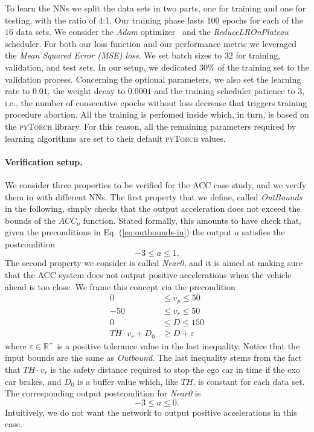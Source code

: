 To learn the NNs we split the data sets in two parts,
one for training and one for testing, with the ratio of 4:1. Our
training phase lasts $100$ epochs for each of the $16$ data sets. We
consider the \textit{Adam} optimizer~\cite{kingma2017adam} and the
\textit{ReduceLROnPlateau} scheduler. For both our loss
function and our performance metric we leveraged the \textit{Mean
	Squared Error (MSE) loss}. We set batch sizes to $32$ for training,
validation, and test sets. In our setup, we dedicated $30\%$ of the
training set to the validation process. Concerning the optional
parameters, we also set the learning rate to $0.01$, the weight decay
to $0.0001$ and the training scheduler patience to $3$, i.e., the
number of consecutive epochs without loss decrease that triggers
training procedure abortion. All the training is perfomed inside
\nevertwo{} which, in turn, is based on the \textsc{pyTorch}
library. For this reason, all the remaining parameters required by 
learning algorithms are set to their default \textsc{pyTorch} values.

\paragraph{Verification setup.}
We consider three properties to be verified for the ACC case study, 
and we verify them in \nevertwo{} with different NNs. The first property 
that we define, called \textit{OutBounds} in the following, simply 
checks that the output acceleration does not exceed the bounds of the
$ACC_o$ function. Stated formally, this amounts to have \nevertwo{} check
that, given the preconditions in Eq. (\ref{eq:outbounds-in}) the output 
$a$ satisfies the postcondition
%
\begin{equation}
	-3 \leq a \leq 1.
	\label{eq:outbounds-out}
\end{equation}
%
The second property we consider is called \textit{Near0}, and it is
aimed at making sure that the ACC system does not output positive
accelerations when the vehicle ahead is too close. We frame this
concept via the precondition
%
\begin{equation}
	\begin{aligned}
		0 & \leq v_p \leq 50 \\
		-50 & \leq v_r \leq 50 \\
		0 & \leq D \leq 150\\
		TH \cdot v_r + D_0 & \geq D + \varepsilon
	\end{aligned}
	\label{eq:near0-in}
\end{equation}
%
where $\varepsilon \in {\mathbb{R}^+}$ is a positive tolerance
value in the last inequality. Notice that the input bounds are the
same as \textit{Outbound}. The last inequality 
stems from the fact that $TH \cdot v_r$ is the safety distance
required to stop the ego car in time if the exo car brakes, and
$D_0$ is a buffer value which, like $TH$, is constant for each data
set. The corresponding output postcondition for \textit{Near0} is
%
\begin{equation}
	-3 \leq a \leq 0.
	\label{eq:near0-out}
\end{equation}
%
Intuitively, we do not want the network to output positive
accelerations in this case.

